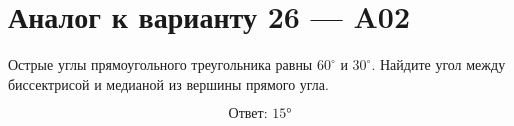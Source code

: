 


\section*{Аналог к варианту 26 — A02}
Острые углы прямоугольного треугольника равны \(60^\circ\) и \(30^\circ\). Найдите угол между биссектрисой и медианой из вершины прямого угла.
\begin{center}\figRightBisectorMedian\end{center}
\[\boxed{\text{Ответ: }15°}\]

